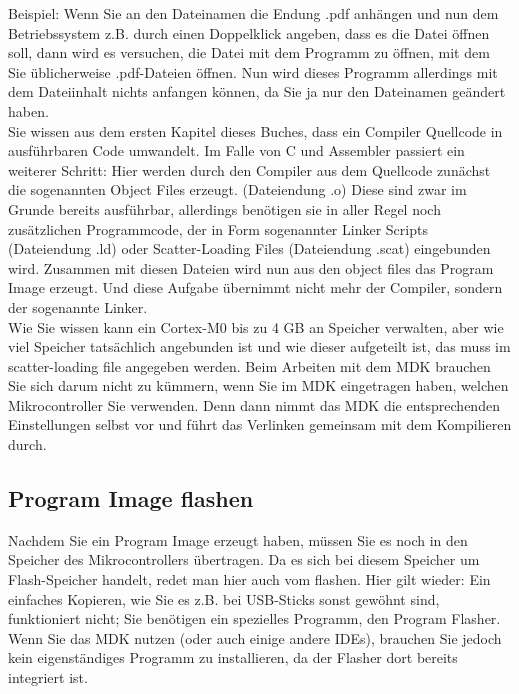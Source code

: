 Beispiel: Wenn Sie an den Dateinamen die Endung .pdf anhängen und nun dem Betriebssystem z.B. durch einen Doppelklick angeben, dass es die Datei öffnen soll, dann wird es versuchen, die Datei mit dem Programm zu öffnen, mit dem Sie üblicherweise .pdf-Dateien öffnen. Nun wird dieses Programm allerdings mit dem Dateiinhalt nichts anfangen können, da Sie ja nur den Dateinamen geändert haben.\\

Sie wissen aus dem ersten Kapitel dieses Buches, dass ein Compiler Quellcode in ausführbaren Code umwandelt. Im Falle von C und Assembler passiert ein weiterer Schritt: Hier werden durch den Compiler aus dem Quellcode zunächst die sogenannten Object Files erzeugt. (Dateiendung .o) Diese sind zwar im Grunde bereits ausführbar, allerdings benötigen sie in aller Regel noch zusätzlichen Programmcode, der in Form sogenannter Linker Scripts (Dateiendung .ld) oder Scatter-Loading Files (Dateiendung .scat) eingebunden wird. Zusammen mit diesen Dateien wird nun aus den object files das Program Image erzeugt. Und diese Aufgabe übernimmt nicht mehr der Compiler, sondern der sogenannte Linker.\\

Wie Sie wissen kann ein Cortex-M0 bis zu 4 GB an Speicher verwalten, aber wie viel Speicher tatsächlich angebunden ist und wie dieser aufgeteilt ist, das muss im scatter-loading file angegeben werden. Beim Arbeiten mit dem MDK brauchen Sie sich darum nicht zu kümmern, wenn Sie im MDK eingetragen haben, welchen Mikrocontroller Sie verwenden. Denn dann nimmt das MDK die entsprechenden Einstellungen selbst vor und führt das Verlinken gemeinsam mit dem Kompilieren durch.

\subsection{Program Image flashen}

Nachdem Sie ein Program Image erzeugt haben, müssen Sie es noch in den Speicher des Mikrocontrollers übertragen. Da es sich bei diesem Speicher um Flash-Speicher handelt, redet man hier auch vom flashen. Hier gilt wieder: Ein einfaches Kopieren, wie Sie es z.B. bei USB-Sticks sonst gewöhnt sind, funktioniert nicht; Sie benötigen ein spezielles Programm, den Program Flasher. Wenn Sie das MDK nutzen (oder auch einige andere IDEs), brauchen Sie jedoch kein eigenständiges Programm zu installieren, da der Flasher dort bereits integriert ist.\\

